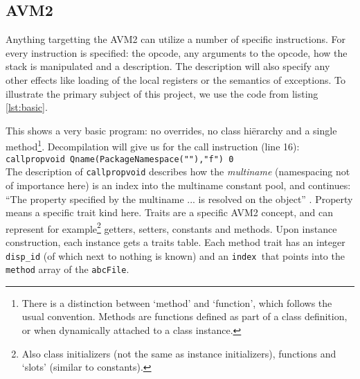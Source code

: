 \documentclass[a4paper,11pt]{scrartcl}
\begin{document}
\subsection{AVM2}
Anything targetting the AVM2 can utilize a number of specific instructions. For every instruction is specified: the opcode, any arguments to the opcode, how the stack is manipulated and a description. The description will also specify any other effects like loading of the local registers or the semantics of exceptions. To illustrate the primary subject of this project, we use the code from listing \ref{lst:basic}.


This shows a very basic program: no overrides, no class hiërarchy and a single method\footnote{There is a distinction between `method' and `function',  which follows the usual convention. Methods are functions defined as part of a class definition, or when dynamically attached to a class instance.}. Decompilation will give us for the call instruction (line 16): \\
\texttt{callpropvoid Qname(PackageNamespace(""),"f") 0} \\
The description of \texttt{callpropvoid} describes how the \textit{multiname} (namespacing not of importance here) is an index into the multiname constant pool, and continues: ``The property specified by the multiname ... is resolved on the object'' \cite{Adobe2007}. Property means a specific trait kind here. Traits are a specific AVM2 concept, and can represent for example\footnote{Also class initializers (not the same as instance initializers), functions and `slots' (similar to constants).} getters, setters, constants and methods. Upon instance construction, each instance gets a traits table. Each method trait has an integer \texttt{disp\_id} (of which next to nothing is known) and an \texttt{index }that points into the \texttt{method} array of the \texttt{abcFile}.
\end{document}
